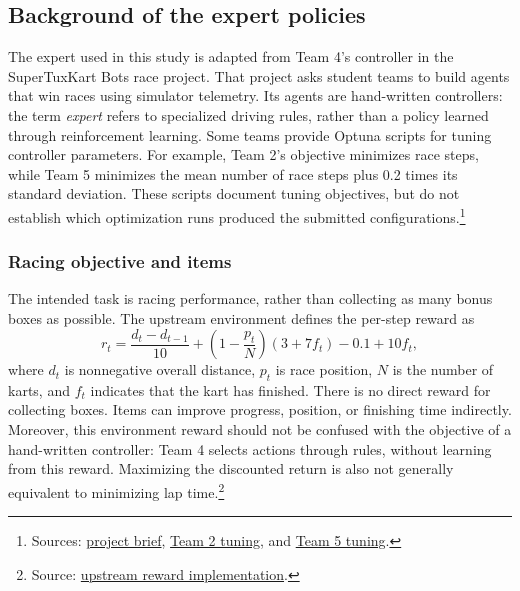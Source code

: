 \subsection{Background of the expert policies}
\label{sec:expert-background}

\qquad The expert used in this study is adapted from Team 4's controller in
the SuperTuxKart Bots race project. That project asks student teams to build
agents that win races using simulator telemetry. Its agents are hand-written
controllers: the term \emph{expert} refers to specialized driving rules, rather
than a policy learned through reinforcement learning.
Some teams provide Optuna scripts for tuning controller parameters. For example,
Team 2's objective minimizes race steps, while Team 5 minimizes the mean number
of race steps plus 0.2 times its standard deviation. These scripts document
tuning objectives, but do not establish which optimization runs produced the
submitted configurations.\footnote{Sources:
\href{https://github.com/osigaud/pystk_project/blob/ddf2cb6573850f890bba26d4e5f82888d9dac82a/README.md}{project brief},
\href{https://github.com/osigaud/pystk_project/blob/ddf2cb6573850f890bba26d4e5f82888d9dac82a/src/agents/team2/optimise_kart.py}{Team 2 tuning}, and
\href{https://github.com/osigaud/pystk_project/blob/ddf2cb6573850f890bba26d4e5f82888d9dac82a/src/agents/team5/optimization.py}{Team 5 tuning}.}

\subsubsection{Racing objective and items}

\qquad The intended task is racing performance, rather than collecting as many
bonus boxes as possible. The upstream environment defines the per-step reward
as
\[
r_t = \frac{d_t-d_{t-1}}{10}
    + \left(1-\frac{p_t}{N}\right)(3+7f_t)
    - 0.1 + 10f_t,
\]
where \(d_t\) is nonnegative overall distance, \(p_t\) is race position,
\(N\) is the number of karts, and \(f_t\) indicates that the kart has finished.
There is no direct reward for collecting boxes. Items can improve progress,
position, or finishing time indirectly. Moreover, this environment reward
should not be confused with the objective of a hand-written controller:
Team 4 selects actions through rules, without learning from this reward.
Maximizing the discounted return is also not generally equivalent to minimizing
lap time.\footnote{Source:
\href{https://github.com/osigaud/pystk_project/blob/ddf2cb6573850f890bba26d4e5f82888d9dac82a/src/pystk2_gymnasium/envs.py}{upstream reward implementation}.}

